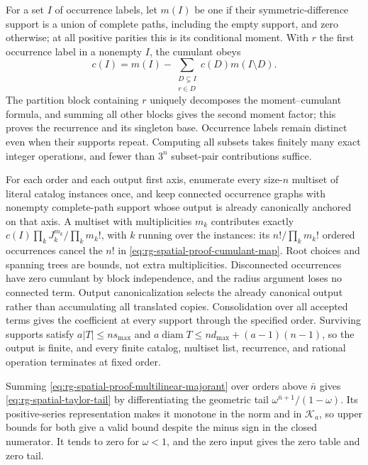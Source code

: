 For a set \(I\) of occurrence labels, let \(m(I)\) be one if their
symmetric-difference support is a union of complete paths, including the
empty support, and zero otherwise; at all positive parities this is its
conditional moment. With \(r\) the first occurrence label in a nonempty
\(I\), the cumulant obeys
\begin{equation}
 c(I)=m(I)-\sum_{\substack{D\subsetneq I\\r\in D}}
                           c(D)m(I\setminus D).
 \label{eq:rg-spatial-proof-cumulant-recurrence}
\end{equation}
The partition block containing \(r\) uniquely decomposes the
moment--cumulant formula, and summing all other blocks gives the second
moment factor; this proves the recurrence and its singleton base.
Occurrence labels remain distinct even when their supports repeat.
Computing all subsets takes finitely many exact integer operations, and
fewer than \(3^n\) subset-pair contributions suffice.

For each order and each output first axis, enumerate every size-\(n\)
multiset of literal catalog instances once, and keep connected occurrence
graphs with nonempty complete-path support whose output is already
canonically anchored on that axis. A multiset with multiplicities
\(m_k\) contributes exactly
\(c(I)\prod_kJ_k^{m_k}/\prod_km_k!\), with \(k\) running over the instances: its
\(n!/\prod_km_k!\) ordered occurrences cancel the \(n!\) in
\cref{eq:rg-spatial-proof-cumulant-map}. Root choices and spanning trees are
bounds, not extra multiplicities. Disconnected occurrences have zero
cumulant by block independence, and the radius argument loses no connected
term. Output canonicalization selects the already canonical output rather
than accumulating all translated copies. Consolidation over all accepted
terms gives the coefficient at every support through the specified order.
Surviving supports satisfy \(a|T|\le ns_{\max}\) and
\(a\operatorname{diam}T\le nd_{\max}+(a-1)(n-1)\), so the output is finite,
and every finite catalog, multiset list, recurrence, and rational operation
terminates at fixed order.

Summing \cref{eq:rg-spatial-proof-multilinear-majorant} over orders above
\(\bar n\) gives \cref{eq:rg-spatial-taylor-tail} by differentiating the
geometric tail \(\omega^{\bar n+1}/(1-\omega)\). Its positive-series
representation makes it monotone in the norm and in \(\mathcal K_a\), so
upper bounds for both give a valid bound despite the minus sign in the
closed numerator. It tends to zero for \(\omega<1\), and the zero input
gives the zero table and zero tail.

